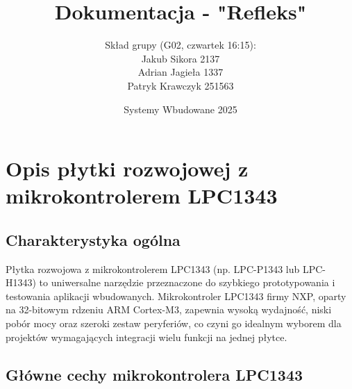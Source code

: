 \documentclass[a4paper,12pt]{report}
\title{Dokumentacja - "Refleks"}
\date{Systemy Wbudowane 2025}
\author{Skład grupy (G02, czwartek 16:15):\\
Jakub Sikora 2137 \\
Adrian Jagieła 1337\\
Patryk Krawczyk 251563}
\begin{document}
\maketitle

\tableofcontents

\chapter{Opis płytki rozwojowej z mikrokontrolerem LPC1343}

\section{Charakterystyka ogólna}

Płytka rozwojowa z mikrokontrolerem LPC1343 (np. LPC-P1343 lub LPC-H1343) to uniwersalne narzędzie przeznaczone do szybkiego prototypowania i testowania aplikacji wbudowanych. Mikrokontroler LPC1343 firmy NXP, oparty na 32-bitowym rdzeniu ARM Cortex-M3, zapewnia wysoką wydajność, niski pobór mocy oraz szeroki zestaw peryferiów, co czyni go idealnym wyborem dla projektów wymagających integracji wielu funkcji na jednej płytce.

\section{Główne cechy mikrokontrolera LPC1343}
\end{document}
